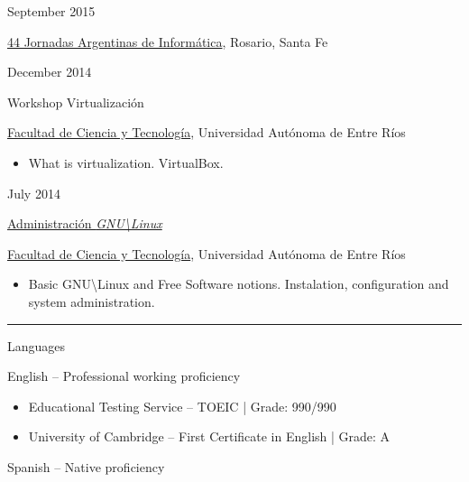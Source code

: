 \documentclass[a4paper,10pt]{article}
\newlength{\cvcolumngapwidth}
\newlength{\cvleftcolumnwidth}
\newlength{\cvrightcolumnwidth}
\newcommand{\cvsectionstyle}[1]{{\normalsize\cvsectionfont\textcolor{cvsectioncolor}{#1}}}
\newcommand{\cvdurationstyle}[1]{{\small\cvdurationfont\textcolor{cvdurationcolor}{#1}}}
\newcommand{\cvheadingstyle}[1]{{\normalsize\cvheadingfont\textcolor{cvheadingcolor}{#1}}}
\newlength{\cvafteritemskipamount}
\newlength{\cvaftersectionskipamount}
\newlength{\cvbetweensectionandheadingextraskipamount}
\newlength{\cvparskip}
\newcommand{\cvsection}[1]{
    \begin{minipage}[t]{\cvleftcolumnwidth}
        \raggedleft\cvsectionstyle{#1}
    \end{minipage}%
    \hspace{\cvcolumngapwidth}%
    \begin{minipage}[t]{\cvrightcolumnwidth}
        \textcolor{cvrulecolor}{\rule{\cvrightcolumnwidth}{0.3mm}}
    \end{minipage}

    \vspace{\cvaftersectionskipamount}
}
\newcommand{\cvitem}[2]{
    \begin{minipage}[t]{\cvleftcolumnwidth}
        \raggedleft #1
    \end{minipage}%
    \hspace{\cvcolumngapwidth}%
    \begin{minipage}[t]{\cvrightcolumnwidth}
        \setlength{\parskip}{\cvparskip} #2
    \end{minipage}

    \vspace{\cvafteritemskipamount}
}
\begin{document}
\cvitem {
    \cvdurationstyle{September 2015}
}{
    \cvheadingstyle{\href{http://44jaiio.sadio.org.ar/}{44 Jornadas Argentinas de Informática}}, Rosario, Santa Fe
}
\cvitem {
    \cvdurationstyle{December 2014}
}{
    \cvheadingstyle{Workshop Virtualización}
    
    \href{https://www.gugler.com.ar/index.php}{Facultad de Ciencia y Tecnología}, Universidad Autónoma de Entre Ríos
    
    \begin{itemize}[leftmargin=*]
        \item What is virtualization. VirtualBox.
    \end{itemize}
}
\cvitem {
    \cvdurationstyle{July 2014}
}{
    \cvheadingstyle{\href{https://www.gugler.com.ar/index.php/cursos-presenciales/sistemas-operativos/administracion-gnu-linux}{Administración \textit{GNU\textbackslash Linux}}}
    
    \href{https://www.gugler.com.ar/index.php}{Facultad de Ciencia y Tecnología}, Universidad Autónoma de Entre Ríos
    
    \begin{itemize}[leftmargin=*]
        \item Basic GNU\textbackslash Linux and Free Software notions. Instalation, configuration and system administration.
    \end{itemize}
}


\cvsection{SKILLS}

\vspace{\cvbetweensectionandheadingextraskipamount}

\cvitem{
    \cvheadingstyle{Languages}
}{
    English -- Professional working proficiency
    
    \begin{itemize}
        \item Educational Testing Service -- TOEIC \hspace{1mm} | \hspace{1mm} Grade: 990/990
        \item University of Cambridge -- First Certificate in English \hspace{1mm} | \hspace{1mm} Grade: A
    \end{itemize}{}

    Spanish -- Native proficiency
}
\end{document}
